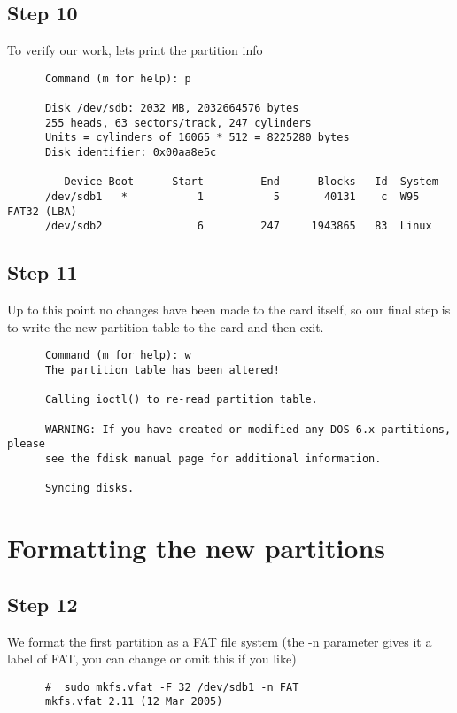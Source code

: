 \documentclass{article}
\begin{document}
   \subsection{Step 10}
      To verify our work, lets print the partition info 
      \begin{verbatim}
      Command (m for help): p 

      Disk /dev/sdb: 2032 MB, 2032664576 bytes 
      255 heads, 63 sectors/track, 247 cylinders 
      Units = cylinders of 16065 * 512 = 8225280 bytes 
      Disk identifier: 0x00aa8e5c 

         Device Boot      Start         End      Blocks   Id  System 
      /dev/sdb1   *           1           5       40131    c  W95 FAT32 (LBA) 
      /dev/sdb2               6         247     1943865   83  Linux 
      \end{verbatim}
   \subsection{Step 11}
      Up to this point no changes have been made to the card itself, so our
      final step is to write the new partition table to the card and then exit.
      \begin{verbatim}
      Command (m for help): w 
      The partition table has been altered! 

      Calling ioctl() to re-read partition table. 

      WARNING: If you have created or modified any DOS 6.x partitions, please 
      see the fdisk manual page for additional information. 

      Syncing disks.
      \end{verbatim}
   \section{Formatting the new partitions}
   \subsection{Step 12}
      We format the first partition as a FAT file system (the -n parameter
      gives it a label of FAT, you can change or omit this if you like)
      \begin{verbatim}
      #  sudo mkfs.vfat -F 32 /dev/sdb1 -n FAT 
      mkfs.vfat 2.11 (12 Mar 2005) 
      \end{verbatim}
\end{document}
